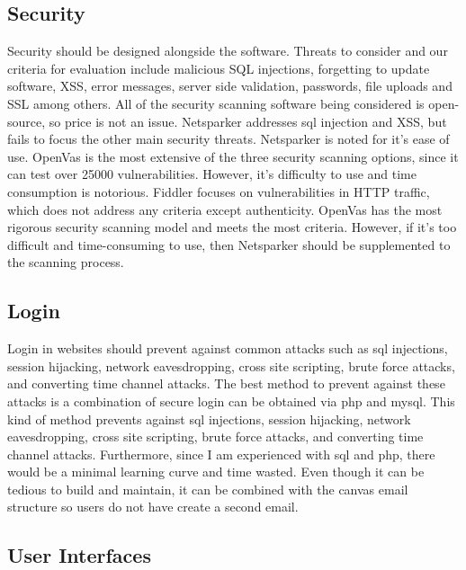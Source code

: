 \documentclass[letterpaper,10pt,titlepage,journal,compsoc,draftclsnofoot,onecolumn]{IEEEtran}
\begin{document}
\subsection{Security}

Security should be designed alongside the software. Threats to consider and our criteria for evaluation include malicious SQL injections, forgetting to update software, XSS, error messages, server side validation, passwords, file uploads and SSL among others. All of the security scanning software being considered is open-source, so price is not an issue. Netsparker addresses sql injection and XSS, but fails to focus the other main security threats. Netsparker is noted for it’s ease of use. OpenVas is the most extensive of the three security scanning options, since it can test over 25000 vulnerabilities. However, it’s difficulty to use and time consumption is notorious. Fiddler focuses on vulnerabilities in HTTP traffic, which does not address any criteria except authenticity. OpenVas has the most rigorous security scanning model and meets the most criteria. However, if it’s too difficult and time-consuming to use, then Netsparker should be supplemented to the scanning process.

\subsection{Login}

Login in websites should prevent against common attacks such as sql injections, session hijacking, network eavesdropping, cross site scripting, brute force attacks,  and converting time channel attacks. The best method to prevent against these attacks is a combination of secure login can be obtained via php and mysql. This kind of method prevents against sql injections, session hijacking, network eavesdropping, cross site scripting, brute force attacks,  and converting time channel attacks. Furthermore, since I am experienced with sql and php, there would be a minimal learning curve and time wasted. Even though it can be tedious to build and maintain, it can be combined with the canvas email structure so users do not have create a second email.

\subsection{User Interfaces}
\end{document}
